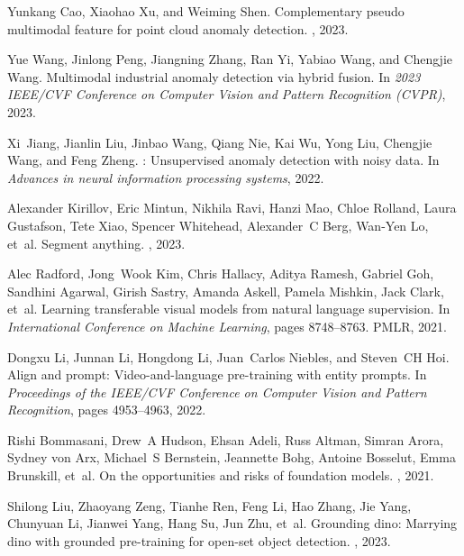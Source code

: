 \documentclass{article}
\begin{document}
{\begin{thebibliography}{10}
Yunkang Cao, Xiaohao Xu, and Weiming Shen.
\newblock Complementary pseudo multimodal feature for point cloud anomaly
  detection.
, 2023.

Yue Wang, Jinlong Peng, Jiangning Zhang, Ran Yi, Yabiao Wang, and Chengjie
  Wang.
\newblock Multimodal industrial anomaly detection via hybrid fusion.
\newblock In {\em 2023 {IEEE}/{CVF} Conference on Computer Vision and Pattern
  Recognition ({CVPR})}, 2023.

Xi~Jiang, Jianlin Liu, Jinbao Wang, Qiang Nie, Kai Wu, Yong Liu, Chengjie Wang,
  and Feng Zheng.
: Unsupervised anomaly detection with noisy data.
\newblock In {\em Advances in neural information processing systems}, 2022.

Alexander Kirillov, Eric Mintun, Nikhila Ravi, Hanzi Mao, Chloe Rolland, Laura
  Gustafson, Tete Xiao, Spencer Whitehead, Alexander~C Berg, Wan-Yen Lo, et~al.
\newblock Segment anything.
, 2023.

Alec Radford, Jong~Wook Kim, Chris Hallacy, Aditya Ramesh, Gabriel Goh,
  Sandhini Agarwal, Girish Sastry, Amanda Askell, Pamela Mishkin, Jack Clark,
  et~al.
\newblock Learning transferable visual models from natural language
  supervision.
\newblock In {\em International Conference on Machine Learning}, pages
  8748--8763. PMLR, 2021.

Dongxu Li, Junnan Li, Hongdong Li, Juan~Carlos Niebles, and Steven~CH Hoi.
\newblock Align and prompt: Video-and-language pre-training with entity
  prompts.
\newblock In {\em Proceedings of the IEEE/CVF Conference on Computer Vision and
  Pattern Recognition}, pages 4953--4963, 2022.

Rishi Bommasani, Drew~A Hudson, Ehsan Adeli, Russ Altman, Simran Arora, Sydney
  von Arx, Michael~S Bernstein, Jeannette Bohg, Antoine Bosselut, Emma
  Brunskill, et~al.
\newblock On the opportunities and risks of foundation models.
, 2021.

Shilong Liu, Zhaoyang Zeng, Tianhe Ren, Feng Li, Hao Zhang, Jie Yang, Chunyuan
  Li, Jianwei Yang, Hang Su, Jun Zhu, et~al.
\newblock Grounding dino: Marrying dino with grounded pre-training for open-set
  object detection.
, 2023.


\end{thebibliography}}
\end{document}
